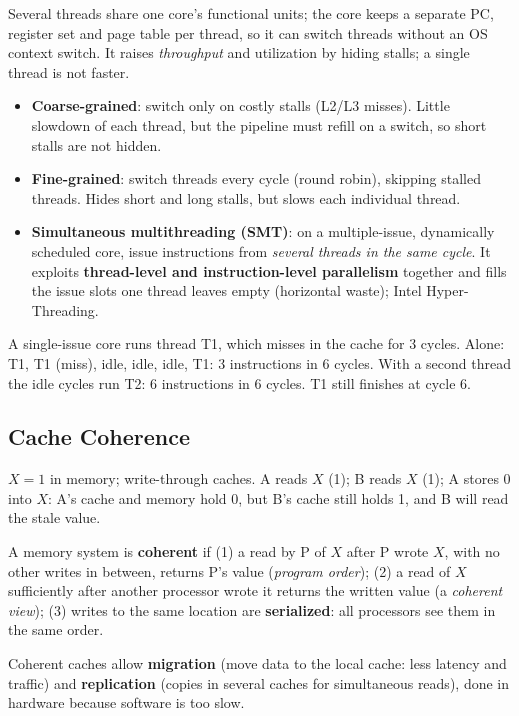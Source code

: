 \begin{definition}
Several threads share one core's functional units; the core keeps a separate PC,
register set and page table per thread, so it can switch threads without an OS
context switch. It raises \emph{throughput} and utilization by hiding stalls; a single
thread is not faster.
\end{definition}
\begin{itemize}
  \item \textbf{Coarse-grained}: switch only on costly stalls (L2/L3 misses). Little
  slowdown of each thread, but the pipeline must refill on a switch, so short stalls
  are not hidden.
  \item \textbf{Fine-grained}: switch threads every cycle (round robin), skipping
  stalled threads. Hides short and long stalls, but slows each individual thread.
  \item \textbf{Simultaneous multithreading (SMT)}: on a multiple-issue, dynamically
  scheduled core, issue instructions from \emph{several threads in the same cycle}.
  It exploits \textbf{thread-level and instruction-level parallelism} together and
  fills the issue slots one thread leaves empty (horizontal waste); Intel
  Hyper-Threading.
\end{itemize}

\begin{eg}
A single-issue core runs thread T1, which misses in the cache for 3 cycles. Alone: T1,
T1 (miss), idle, idle, idle, T1: 3 instructions in 6 cycles. With a second thread the
idle cycles run T2: 6 instructions in 6 cycles. T1 still finishes at cycle 6.
\end{eg}

\subsection{Cache Coherence}
\label{sec:coherence}

\begin{eg}
$X=1$ in memory; write-through caches. A reads $X$ (1); B reads $X$ (1); A stores 0
into $X$: A's cache and memory hold 0, but B's cache still holds 1, and B will read
the stale value.
\end{eg}

\begin{definition}[Coherence]
A memory system is \textbf{coherent} if (1) a read by P of $X$ after P wrote $X$, with
no other writes in between, returns P's value (\emph{program order}); (2) a read of
$X$ sufficiently after another processor wrote it returns the written value (a
\emph{coherent view}); (3) writes to the same location are \textbf{serialized}: all
processors see them in the same order.
\end{definition}
Coherent caches allow \textbf{migration} (move data to the local cache: less latency
and traffic) and \textbf{replication} (copies in several caches for simultaneous
reads), done in hardware because software is too slow.

